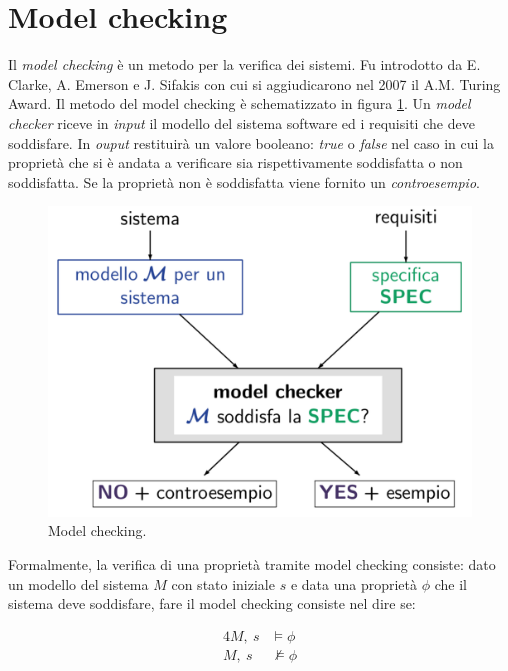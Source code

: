 \section{Model checking}
Il \emph{model checking} è un metodo per la verifica dei sistemi. Fu introdotto da E. Clarke, A. Emerson e J. Sifakis con cui si aggiudicarono nel 2007 il A.M. Turing Award.
Il metodo del model checking è schematizzato in figura \ref{fig:model_checking}. Un \emph{model checker} riceve in \emph{input} il modello del sistema software ed i requisiti che deve soddisfare. In \emph{ouput} restituirà un valore booleano: \emph{true} o \emph{false} nel caso in cui la proprietà che si è andata a verificare  sia rispettivamente soddisfatta o non soddisfatta. Se la proprietà non è soddisfatta viene fornito un \emph{controesempio}.
\\

\begin{figure}[ht]
\begin{center}
\includegraphics[scale=0.3]{img/Model-checking.pdf}
\caption{Model checking.}
\label{fig:model_checking}
\end{center}
\end{figure}

Formalmente, la verifica di una proprietà tramite model checking consiste: dato un modello del sistema $M$ con stato iniziale $s$ e data una proprietà $\phi$ che il sistema deve soddisfare, fare il model checking consiste nel dire se:

\begin{alignat}{4}
M,\ s 		& 	\models \phi \\
M,\ s  		& 	\not \models \phi
\end{alignat}

